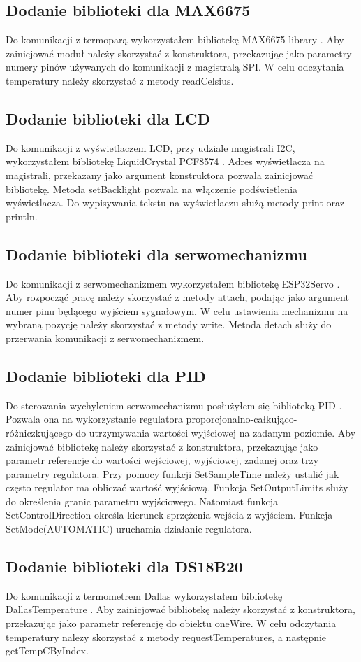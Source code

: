 \documentclass[11pt]{report}
\begin{document}
 \subsection{Dodanie biblioteki dla MAX6675}
 Do komunikacji z termoparą wykorzystałem bibliotekę MAX6675 library \cite{MAX6675library}. Aby zainicjować moduł należy skorzystać z konstruktora, przekazując jako parametry numery pinów używanych do komunikacji z magistralą SPI.
 W celu odczytania temperatury należy skorzystać z metody readCelsius.
 \subsection{Dodanie biblioteki dla LCD}
 Do komunikacji z wyświetlaczem LCD, przy udziale magistrali I2C, wykorzystałem bibliotekę LiquidCrystal PCF8574 \cite{LCDlibrary}. Adres wyświetlacza na magistrali, przekazany jako argument konstruktora pozwala zainicjować bibliotekę. Metoda setBacklight pozwala na włączenie podświetlenia wyświetlacza. Do wypisywania tekstu na wyświetlaczu służą metody print oraz println.
 \subsection{Dodanie biblioteki dla serwomechanizmu}
 Do komunikacji z serwomechanizmem wykorzystałem bibliotekę ESP32Servo \cite{Servolibrary}. Aby rozpocząć pracę należy skorzystać z metody attach, podając jako argument numer pinu będącego wyjściem sygnałowym. W celu ustawienia mechanizmu na wybraną pozycję należy skorzystać z metody write. Metoda detach służy do przerwania komunikacji z serwomechanizmem.
 \subsection{Dodanie biblioteki dla PID}
 Do sterowania wychyleniem serwomechanizmu posłużyłem się biblioteką PID \cite{PIDlibrary}. Pozwala ona na wykorzystanie regulatora proporcjonalno-całkująco-różniczkującego do utrzymywania wartości wyjściowej na zadanym poziomie.
 Aby zainicjować bibliotekę  należy skorzystać z konstruktora, przekazując jako parametr referencje do wartości wejściowej, wyjściowej, zadanej oraz trzy parametry regulatora. Przy pomocy funkcji SetSampleTime należy ustalić jak często regulator ma obliczać wartość wyjściową. Funkcja SetOutputLimits służy do określenia granic parametru wyjściowego. Natomiast funkcja SetControlDirection określa kierunek sprzężenia wejścia z wyjściem. Funkcja SetMode(AUTOMATIC) uruchamia działanie regulatora.
 \subsection{Dodanie biblioteki dla DS18B20}
 Do komunikacji z termometrem Dallas wykorzystałem bibliotekę DallasTemperature \cite{dallaslibrary}. Aby zainicjować bibliotekę należy skorzystać z konstruktora, przekazując jako parametr referencję do obiektu oneWire. W celu odczytania temperatury nalezy skorzystać z metody requestTemperatures, a następnie getTempCByIndex.
\end{document}
